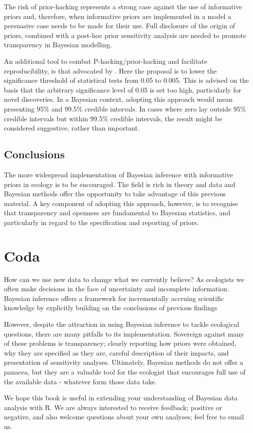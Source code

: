 \documentclass[
]{book}
\begin{document}
The risk of prior-hacking represents a strong case against the use of informative priors and, therefore, when informative priors are implemented in a model a persuasive case needs to be made for their use. Full disclosure of the origin of priors, combined with a post-hoc prior sensitivity analysis are needed to promote transparency in Bayesian modelling.

An additional tool to combat P-hacking/prior-hacking and facilitate reproducibility, is that advocated by \citet{Benjamin_2017}. Here the proposal is to lower the significance threshold of statistical tests from 0.05 to 0.005. This is advised on the basis that the arbitrary significance level of 0.05 is set too high, particularly for novel discoveries. In a Bayesian context, adopting this approach would mean presenting 95\% and 99.5\% credible intervals. In cases where zero lay outside 95\% credible intervals but within 99.5\% credible intervals, the result might be considered suggestive, rather than important.

\hypertarget{conclusions-6}{%
\section{Conclusions}\label{conclusions-6}}

The more widespread implementation of Bayesian inference with informative priors in ecology is to be encouraged. The field is rich in theory and data and Bayesian methods offer the opportunity to take advantage of this previous material. A key component of adopting this approach, however, is to recognise that transparency and openness are fundamental to Bayesian statistics, and particularly in regard to the specification and reporting of priors.

\hypertarget{coda}{%
\chapter{Coda}\label{coda}}

How can we use new data to change what we currently believe? As ecologists we often make decisions in the face of uncertainty and incomplete information. Bayesian inference offers a framework for incrementally accruing scientific knowledge by explicitly building on the conclusions of previous findings

However, despite the attraction in using Bayesian inference to tackle ecological questions, there are many pitfalls to its implementation. Sovereign against many of these problems is transparency; clearly reporting how priors were obtained, why they are specified as they are, careful description of their impacts, and presentation of sensitivity analyses. Ultimately, Bayesian methods do not offer a panacea, but they are a valuable tool for the ecologist that encourages full use of the available data - whatever form those data take.

We hope this book is useful in extending your understanding of Bayesian data analysis with R. We are always interested to receive feedback; positive or negative, and also welcome questions about your own analyses; feel free to email us.

  
\end{document}
